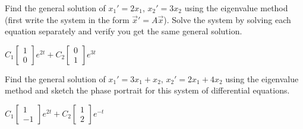 \begin{exercise}
\leavevmode
\begin{tasks}
\task
Find the general solution of $x_1' = 2 x_1$, $x_2' = 3 x_2$ using the
eigenvalue method (first write the system in the form
${\vec{x}}' = A \vec{x}$).
\task
Solve the system by solving each equation
separately and verify you get the same general solution.
\end{tasks}
\end{exercise}
\comboSol{%
}
{%
$C_1\left[\begin{smallmatrix} 1 \\ 0 \end{smallmatrix}\right]e^{2t} + C_2\left[\begin{smallmatrix} 0 \\ 1  \end{smallmatrix}\right]e^{3t}$
}

\begin{exercise}
Find the general solution of $x_1' = 3 x_1 + x_2$,
$x_2' = 2 x_1 + 4 x_2$ using the eigenvalue method and sketch the phase portrait for this system of differential equations.
\end{exercise}
\comboSol{%
}
{%
$C_1 \left[\begin{smallmatrix} 1 \\ -1 \end{smallmatrix}\right]e^{2t} + C_2\left[\begin{smallmatrix} 1 \\ 2 \end{smallmatrix}\right]e^{-t}$ \hfill
{} \hfill \hfill
}

